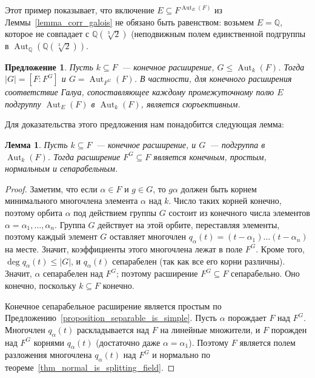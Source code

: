 \documentclass[a4paper,11pt]{scrartcl}
\theoremstyle{plain}
\newtheorem{proposition}[theorem]{Предложение}
\newtheorem{lemma}[theorem]{Лемма}
\theoremstyle{definition}
\newcommand\mb{\mathbb}
\newcommand\sseq{\subseteq}
\newcommand\Aut{\operatorname{Aut}}
\begin{document}
Этот пример показывает, что включение $E\sseq F^{\Aut_E(F)}$ из
Леммы~\ref{lemma_corr_galois} не
обязано быть равенством: возьмем $E=\mb Q$, которое не совпадает с
$\mb Q(\sqrt[3]{2})$ (неподвижным полем единственной подгруппы в
$\Aut_{\mb Q}(\mb Q(\sqrt[3]{2}))$.

\begin{proposition}\label{prop_galois_corr_surjective}
Пусть $k\sseq F$~--- конечное расширение, $G\leq\Aut_k(F)$. Тогда
$|G|=[F:F^G]$ и $G=\Aut_{F^G}(F)$. В частности, для конечного
расширения соответствие Галуа,
сопоставляющее каждому промежуточному полю $E$ подгруппу $\Aut_E(F)$ в
$\Aut_k(F)$, является сюръективным.
\end{proposition}

Для доказательства этого предложения нам понадобится следующая лемма:
\begin{lemma}\label{stable_is_galois}
Пусть $k\sseq F$~--- конечное расширение, и $G$~--- подгруппа в
$\Aut_k(F)$. Тогда расширение $F^G\sseq F$ является конечным, простым,
нормальным и сепарабельным. 
\end{lemma}
\begin{proof}
Заметим, что если $\alpha\in F$ и $g\in G$, то $g\alpha$ должен быть
корнем
минимального многочлена элемента $\alpha$ над $k$. Число таких корней
конечно, поэтому орбита $\alpha$ под действием группы $G$ состоит из
конечного числа элементов $\alpha=\alpha_1,\dots,\alpha_n$.
Группа $G$ действует
на этой орбите, переставляя элементы, поэтому каждый элемент $G$
оставляет многочлен $q_\alpha(t)=(t-\alpha_1)\dots(t-\alpha_n)$ на
месте. Значит,
коэффициенты этого многочлена лежат в поле $F^G$.
Кроме того, $\deg q_\alpha(t)\leq |G|$, и $q_\alpha(t)$ сепарабелен 
(так как все его корни различны).
Значит, $\alpha$ сепарабелен над $F^G$;
поэтому расширение
$F^G\sseq F$ сепарабельно. Оно конечно, поскольку $k\sseq F$ конечно.

Конечное сепарабельное расширение является простым по
Предложению~\ref{proposition_separable_is_simple}. Пусть $\alpha$
порождает $F$ над $F^G$. Многочлен $q_\alpha(t)$ раскладывается над
$F$ на
линейные множители, и $F$ порожден над $F^G$ корнями $q_\alpha(t)$
(достаточно даже $\alpha=\alpha_1$). Поэтому $F$ является полем
разложения
многочлена $q_\alpha(t)$ над $F^G$ и нормально по
теореме~\ref{thm_normal_is_splitting_field}.
\end{proof}
\end{document}
